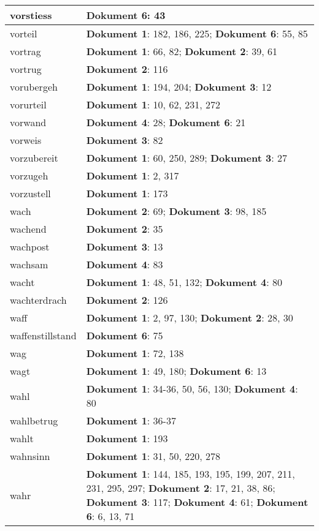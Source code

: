 \documentclass[a5paper]{article}
\begin{document}
\begin{longtable}[l]{|l|p{3in}|}
vorstiess & \textbf{Dokument 6}: 43 \\
\hline
vorteil & \textbf{Dokument 1}: 182, 186, 225; \textbf{Dokument 6}: 55, 85 \\
\hline
vortrag & \textbf{Dokument 1}: 66, 82; \textbf{Dokument 2}: 39, 61 \\
\hline
vortrug & \textbf{Dokument 2}: 116 \\
\hline
vorubergeh & \textbf{Dokument 1}: 194, 204; \textbf{Dokument 3}: 12 \\
\hline
vorurteil & \textbf{Dokument 1}: 10, 62, 231, 272 \\
\hline
vorwand & \textbf{Dokument 4}: 28; \textbf{Dokument 6}: 21 \\
\hline
vorweis & \textbf{Dokument 3}: 82 \\
\hline
vorzubereit & \textbf{Dokument 1}: 60, 250, 289; \textbf{Dokument 3}: 27 \\
\hline
vorzugeh & \textbf{Dokument 1}: 2, 317 \\
\hline
vorzustell & \textbf{Dokument 1}: 173 \\
\hline
wach & \textbf{Dokument 2}: 69; \textbf{Dokument 3}: 98, 185 \\
\hline
wachend & \textbf{Dokument 2}: 35 \\
\hline
wachpost & \textbf{Dokument 3}: 13 \\
\hline
wachsam & \textbf{Dokument 4}: 83 \\
\hline
wacht & \textbf{Dokument 1}: 48, 51, 132; \textbf{Dokument 4}: 80 \\
\hline
wachterdrach & \textbf{Dokument 2}: 126 \\
\hline
waff & \textbf{Dokument 1}: 2, 97, 130; \textbf{Dokument 2}: 28, 30 \\
\hline
waffenstillstand & \textbf{Dokument 6}: 75 \\
\hline
wag & \textbf{Dokument 1}: 72, 138 \\
\hline
wagt & \textbf{Dokument 1}: 49, 180; \textbf{Dokument 6}: 13 \\
\hline
wahl & \textbf{Dokument 1}: 34-36, 50, 56, 130; \textbf{Dokument 4}: 80 \\
\hline
wahlbetrug & \textbf{Dokument 1}: 36-37 \\
\hline
wahlt & \textbf{Dokument 1}: 193 \\
\hline
wahnsinn & \textbf{Dokument 1}: 31, 50, 220, 278 \\
\hline
wahr & \textbf{Dokument 1}: 144, 185, 193, 195, 199, 207, 211, 231, 295, 297; \textbf{Dokument 2}: 17, 21, 38, 86; \textbf{Dokument 3}: 117; \textbf{Dokument 4}: 61; \textbf{Dokument 6}: 6, 13, 71 \\

\end{longtable}
\end{document}
